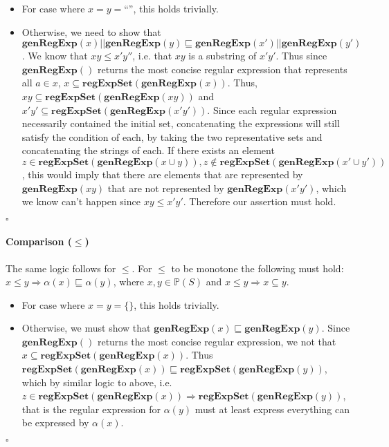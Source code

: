 \documentclass{article}
\newcommand{\powerset}[1]{\mathbb{P}(#1)}
\newcommand{\regExpSet}[1]{\mathbf{regExpSet}(#1)}
\newcommand{\genRegExp}[1]{\mathbf{genRegExp}(#1)}
\begin{document}
\begin{itemize}
	\item For case where $x = y = \text{``''}$, this holds trivially.
	\item Otherwise, we need to show that $\genRegExp{x}||\genRegExp{y} \sqsubseteq  \genRegExp{x'}||\genRegExp{y'}$.  We know that $xy \leq x'y''$, i.e. that $xy$ is a substring of $x'y'$.  Thus since $\genRegExp{}$ returns the most concise regular expression that represents all $a \in x$, $x \subseteq \regExpSet{\genRegExp{x}}$. Thus, $xy \subseteq \regExpSet{\genRegExp{xy}}$ and $x'y' \subseteq \regExpSet{\genRegExp{x'y'}}$.  Since each regular expression necessarily contained the initial set, concatenating the expressions will still satisfy the condition of each, by taking the two representative sets and concatenating the strings of each. If there exists an element $z \in \regExpSet{\genRegExp{x \cup y}}, z \notin \regExpSet{\genRegExp{x' \cup y'}}$, this would imply that there are elements that are represented by $\genRegExp{xy}$ that are not represented by $\genRegExp{x' y'}$, which we know can't happen since $xy \leq x'y'$.  Therefore our assertion must hold.
\end{itemize}
$\square$

\paragraph{Comparison ($\leq$)}
The same logic follows for $\leq$. For $\leq$ to be monotone the following must hold: $x \leq y \Rightarrow  \alpha(x) \sqsubseteq \alpha(y)$, where $x,y \in \powerset{S}$ and $x \leq y \Rightarrow x \subseteq y$.
\begin{itemize}
	\item For case where $x = y = \{\}$, this holds trivially.
	\item Otherwise, we must show that $\genRegExp{x} \sqsubseteq \genRegExp{y}$. Since $\genRegExp{}$ returns the most concise regular expression, we not that $x \subseteq \regExpSet{\genRegExp{x}}$.  Thus $\regExpSet{\genRegExp{x}} \sqsubseteq \regExpSet{\genRegExp{y}}$, which by similar logic to above, i.e. $z \in \regExpSet{\genRegExp{x}} \Rightarrow \regExpSet{\genRegExp{y}}$, that is the regular expression for $\alpha(y)$ must at least express everything can be expressed by $\alpha(x)$.
\end{itemize}
$\square$
\end{document}
